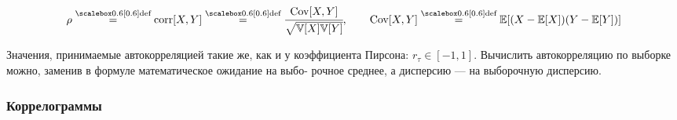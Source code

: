 \begin{equation*}
    \rho \defeq \text{corr}[X, Y] \defeq 
    \cfrac{\text{Cov}[X, Y]}{\sqrt{\mathbb{V}[X]\mathbb{V}[Y]}}, \qquad 
    \text{Cov}[X, Y] \defeq \mathbb{E}[(X - \mathbb{E}[X])(Y - \mathbb{E}[Y])]
\end{equation*}

Значения, принимаемые автокорреляцией такие же, как и у коэффициента 
Пирсона: $r_\tau \in [-1, 1]$. Вычислить автокорреляцию по выборке можно, заменив в формуле математическое ожидание на выбо-
рочное среднее, а дисперсию — на выборочную дисперсию.

\subsubsection{Коррелограммы}

